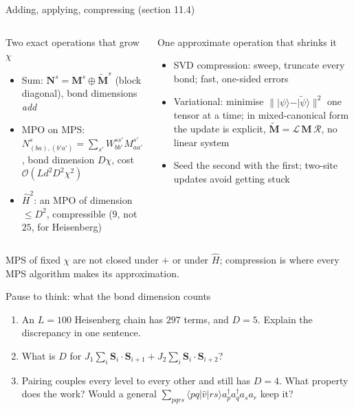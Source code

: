 \documentclass[aspectratio=169,10pt]{beamer}
\newcounter{thinkctr}
\newcommand{\thinkq}[2]{%
  \stepcounter{thinkctr}%
  \begin{tcolorbox}[colback=palewarm,colframe=warm,title={\bfseries Pause to think \#\thethinkctr\hfill\mdseries\small(about #1 min -- discuss with your neighbour)},fonttitle=\bfseries]
  #2
  \end{tcolorbox}}
\newcommand{\ket}[1]{\vert #1\rangle}
\newcommand{\element}[3]{\langle #1\vert #2\vert #3\rangle}
\newcommand{\bigO}{\mathcal{O}}
\newcommand{\bmat}[1]{\bm{#1}}
\newcommand{\ad}[1]{a_{#1}^{\dagger}}
\begin{document}
\begin{frame}{Adding, applying, compressing (section 11.4)}
  \small
  \begin{columns}[T]
    \begin{block}{Two exact operations that grow $\chi$}
      \begin{itemize}
        \item Sum: $\bmat N^{s}=\bmat M^{s}\oplus\tilde{\bmat M}^{s}$ (block diagonal), bond dimensions \emph{add}
        \item MPO on MPS: $N^{s}_{(ba),(b'a')}=\sum_{s'}W^{ss'}_{bb'}M^{s'}_{aa'}$, bond dimension $D\chi$, cost $\bigO(Ld^2D^2\chi^2)$
        \item $\hat H^2$: an MPO of dimension $\le D^2$, compressible ($9$, not $25$, for Heisenberg)
      \end{itemize}
    \end{block}
    \begin{block}{One approximate operation that shrinks it}
      \begin{itemize}
        \item SVD compression: sweep, truncate every bond; fast, one-sided errors
        \item Variational: minimise $\|\ket\psi-\ket{\tilde\psi}\|^2$ one tensor at a time; in mixed-canonical form the update is explicit, $\tilde{\bmat M}=\mathcal L\,\bmat M\,\mathcal R$, no linear system
        \item Seed the second with the first; two-site updates avoid getting stuck
      \end{itemize}
    \end{block}
  \end{columns}
  \vspace{0.4em}
  \centering MPS of fixed $\chi$ are not closed under $+$ or under $\hat H$; \alert{compression is where every MPS algorithm makes its approximation.}
\end{frame}

\begin{frame}{Pause to think: what the bond dimension counts}
  \thinkq{4}{
  \begin{enumerate}
    \item An $L=100$ Heisenberg chain has $297$ terms, and $D=5$. Explain the discrepancy in one sentence.
    \item What is $D$ for $J_1\sum_i\bm S_i\cdot\bm S_{i+1}+J_2\sum_i\bm S_i\cdot\bm S_{i+2}$?
    \item Pairing couples every level to every other and still has $D=4$. What property does the work? Would a general $\sum_{pqrs}\element{pq}{\hat v}{rs}\ad p\ad qa_sa_r$ keep it?
  \end{enumerate}}
\end{frame}
\end{document}

